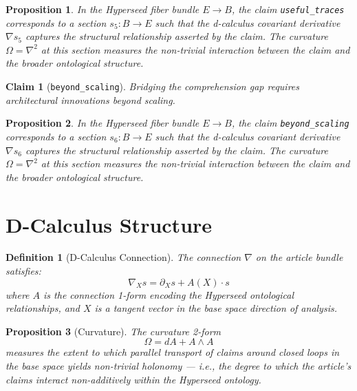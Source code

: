 \documentclass{article}
\newtheorem{claim}{Claim}
\newtheorem{definition}{Definition}
\newtheorem{proposition}{Proposition}
\begin{document}
\begin{proposition}
In the Hyperseed fiber bundle $E \to B$, the claim \texttt{useful_traces} corresponds to a section $s_5: B \to E$ such that the d-calculus covariant derivative $\nabla s_5$ captures the structural relationship asserted by the claim. The curvature $\Omega = \nabla^2$ at this section measures the non-trivial interaction between the claim and the broader ontological structure.
\end{proposition}

\begin{claim}[\texttt{beyond_scaling}]
Bridging the comprehension gap requires architectural innovations beyond scaling.
\end{claim}

\begin{proposition}
In the Hyperseed fiber bundle $E \to B$, the claim \texttt{beyond_scaling} corresponds to a section $s_6: B \to E$ such that the d-calculus covariant derivative $\nabla s_6$ captures the structural relationship asserted by the claim. The curvature $\Omega = \nabla^2$ at this section measures the non-trivial interaction between the claim and the broader ontological structure.
\end{proposition}

\section{D-Calculus Structure}

\begin{definition}[D-Calculus Connection]
The connection $\nabla$ on the article bundle satisfies:
\begin{equation}
  \nabla_X s = \partial_X s + A(X) \cdot s
\end{equation}
where $A$ is the connection 1-form encoding the Hyperseed ontological relationships, and $X$ is a tangent vector in the base space direction of analysis.
\end{definition}

\begin{proposition}[Curvature]
The curvature 2-form
\begin{equation}
  \Omega = dA + A \wedge A
\end{equation}
measures the extent to which parallel transport of claims around closed loops in the base space yields non-trivial holonomy --- i.e., the degree to which the article's claims interact non-additively within the Hyperseed ontology.
\end{proposition}
\end{document}
